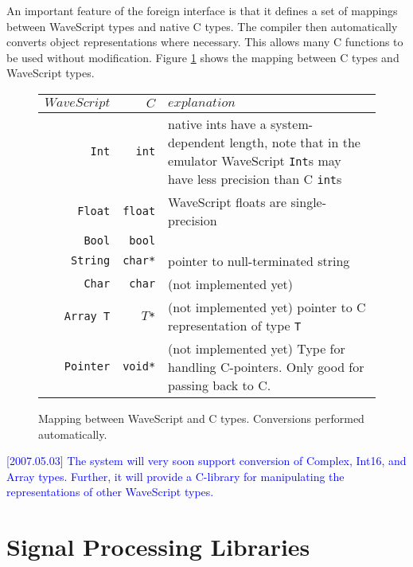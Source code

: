 \documentclass[twocolumn]{report}
\newcommand{\rednote}[1]{{\textcolor{blue}{#1}}}
\begin{document}
An important feature of the foreign interface is that it defines a set
of mappings between WaveScript types and native C types.  The compiler
then automatically converts object representations where necessary.
This allows many C functions to be used without modification.  Figure
\ref{f:types} shows the mapping between C types and WaveScript types.

\begin{figure}
\begin{center}
\begin{tabular}{|r|r|l|}
\hline
$WaveScript$ & $C$ & $explanation$\\
\hline
{\tt Int}   & {\tt int}   & 
  \parbox[t]{2.2in}{native ints have a system-dependent 
length, note that in the emulator WaveScript {\tt Int}s may 
have less precision than C {\tt int}s} \\

{\tt Float} & {\tt float} & 
\parbox[t]{2.2in}{WaveScript floats are single-precision}\\

{\tt Bool} & {\tt bool} & \\

{\tt String} & {\tt char*} & pointer to null-terminated string \\


{\tt Char} & {\tt char} & (not implemented yet) \\

{\tt Array T} & {\tt $T$*} & \parbox[t]{2.2in}{
(not implemented yet) 
pointer to C representation of type {\tt T} 
}\\

{\tt Pointer} & {\tt void*} &  \parbox[t]{2.2in}{
(not implemented yet) Type for handling C-pointers.  Only good for
  passing back to C.
}\\

\hline
\end{tabular}
\end{center}
\caption{Mapping between WaveScript and C types.  Conversions
  performed automatically.}
\label{f:types}
\end{figure}

\rednote{[2007.05.03] The system will very soon support conversion of
  Complex, Int16, and Array types.  Further, it will provide a
  C-library for manipulating the representations of other WaveScript types.}

\chapter{Signal Processing Libraries}
\end{document}
